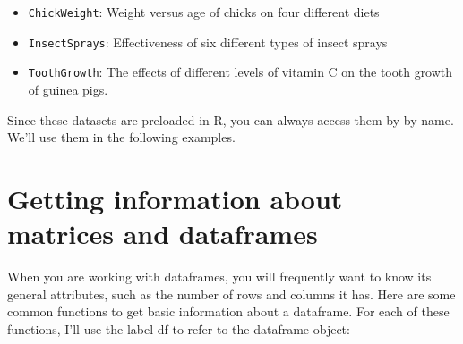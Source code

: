 \documentclass{tufte-book}\usepackage[]{graphicx}\usepackage[]{color}
\begin{document}
\begin{itemize}
  \item \texttt{ChickWeight}: Weight versus age of chicks on four different diets
  \item \texttt{InsectSprays}: Effectiveness of six different types of insect sprays
  \item \texttt{ToothGrowth}: The effects of different levels of vitamin C on the tooth growth of guinea pigs.
\end{itemize}

Since these datasets are preloaded in R, you can always access them by by name. We'll use them in the following examples.


\section{Getting information about matrices and dataframes}

When you are working with dataframes, you will frequently want to know its general attributes, such as the number of rows and columns it has. Here are some common functions to get basic information about a dataframe. For each of these functions, I'll use the label df to refer to the dataframe object:
\end{document}
